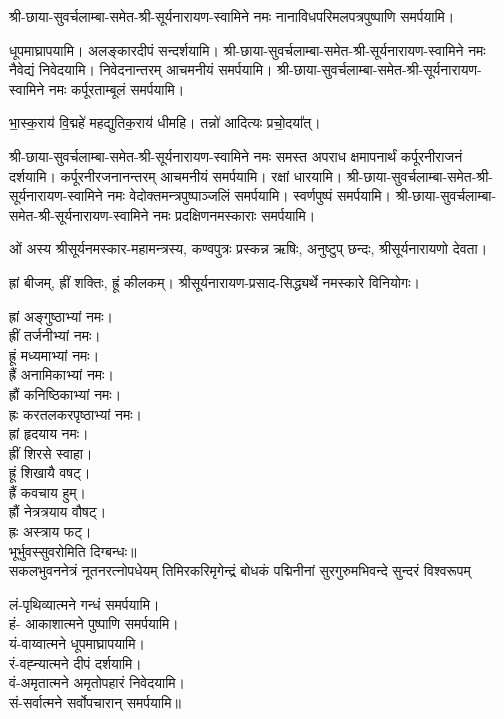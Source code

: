\begingroup
\setlength{\columnseprule}{1pt}
\let\chapt\sect

\endgroup


 श्री-छाया-सुवर्चलाम्बा-समेत-श्री-सूर्यनारायण-स्वामिने नमः नानाविध\-परिमल\-पत्र\-पुष्पाणि समर्पयामि।


\renewcommand{\devAya}{श्री-छाया-सुवर्चलाम्बा-समेत-श्री-सूर्यनारायण-स्वामिने नमः}

धूपमाघ्रापयामि। अलङ्कारदीपं सन्दर्शयामि।
\devAya{} नैवेद्यं निवेदयामि। निवेदनान्तरम् आचमनीयं समर्पयामि।
\devAya{} कर्पूरताम्बूलं समर्पयामि।

भा॒स्क॒राय॑ वि॒द्महे॑ महद्युतिक॒राय॑ धीमहि। 
तन्नो॑ आदित्यः प्रचो॒दया᳚त्। 

\devAya{} समस्त अपराध क्षमापनार्थं कर्पूरनीराजनं दर्शयामि। कर्पूरनीरजनानन्तरम् आचमनीयं समर्पयामि। रक्षां धारयामि।
\devAya{} वेदोक्तमन्त्रपुष्पाञ्जलिं समर्पयामि। स्वर्णपुष्पं समर्पयामि।
\devAya{} प्रदक्षिणनमस्काराः समर्पयामि।


ओं अस्य श्रीसूर्यनमस्कार-महामन्त्रस्य, कण्वपुत्रः प्रस्कन्न ऋषिः, अनुष्टुप् छन्दः, श्रीसूर्यनारायणो देवता।

ह्रां बीजम्, ह्रीं शक्तिः, ह्रूं कीलकम्। श्रीसूर्यनारायण-प्रसाद-सिद्ध्यर्थे नमस्कारे विनियोगः।

ह्रां अङ्गुष्ठाभ्यां नमः।\\
ह्रीं तर्जनीभ्यां नमः।\\
ह्रूं मध्यमाभ्यां नमः।\\
ह्रैं अनामिकाभ्यां नमः।\\
ह्रौं कनिष्ठिकाभ्यां नमः।\\
ह्रः करतलकरपृष्ठाभ्यां नमः।\\

ह्रां हृदयाय नमः।\\
ह्रीं शिरसे स्वाहा।\\
ह्रूं शिखायै वषट्।\\
ह्रैं कवचाय हुम्।\\
ह्रौं नेत्रत्रयाय वौषट्।\\
ह्रः अस्त्राय फट्।\\

भूर्भुवस्सुवरोमिति दिग्बन्धः॥\\

{सकलभुवननेत्रं नूतनरत्नोपधेयम्}
{तिमिरकरिमृगेन्द्रं बोधकं पद्मिनीनां}
{सुरगुरुमभिवन्दे सुन्दरं विश्वरूपम्}

लं-पृथिव्यात्मने गन्धं समर्पयामि।\\
हं- आकाशात्मने पुष्पाणि समर्पयामि।\\
यं-वाय्वात्मने धूपमाघ्रापयामि।\\
रं-वह्न्यात्मने दीपं दर्शयामि।\\
वं-अमृतात्मने अमृतोपहारं निवेदयामि।\\
सं-सर्वात्मने सर्वोपचारान् समर्पयामि॥\\


